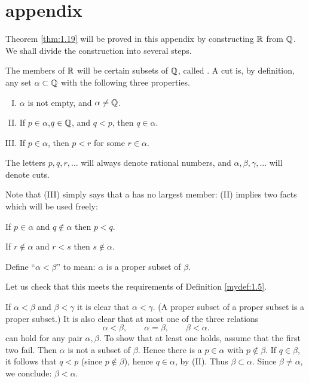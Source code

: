 \section*{appendix}
Theorem \ref{thm:1.19} will be proved in this appendix 
by constructing ${\protect\mathbb R}$ from ${\protect\mathbb Q}$. 
We shall divide the construction into several steps.

The members of ${\protect\mathbb R}$ will be certain subsets of ${\protect\mathbb Q}$, called . 
A cut is, by definition, 
any set $\alpha \subset {\protect\mathbb Q}$ with the following three properties.
\begin{enumerate}[(I)]
    \item $\alpha$ is not empty, and $\alpha \neq {\protect\mathbb Q}$.
    \item If $p\in \alpha$,$q \in {\protect\mathbb Q}$, and $q <p$, then $q \in \alpha$.
    \item If $p \in \alpha$, then $p <r$ for some $r\in \alpha$.
\end{enumerate}

The letters $p, q, r, ...$ will always denote rational numbers, 
and $\alpha, \beta, \gamma, ...$ will denote cuts.

Note that (III) simply says that a has no largest member: 
(II) implies two facts which will be used freely:

If $p\in\alpha$ and $q\not\in\alpha$ then $p<q$.

If $r\not\in \alpha$ and $r<s$ then $s\not\in \alpha$.

Define ``$\alpha < \beta$'' to mean: 
$\alpha$ is a proper subset of $\beta$.

Let us check that this meets the requirements of Definition \ref{mydef:1.5}.

If $\alpha < \beta$ and $\beta < \gamma$ it is clear that $\alpha < \gamma$. 
(A proper subset of a proper subset is a proper subset.) 
It is also clear that at most one of the three relations
\begin{equation*}
    \alpha < \beta, \qquad
    \alpha = \beta, \qquad
    \beta < \alpha.
\end{equation*}
can hold for any pair $\alpha, \beta$. 
To show that at least one holds, assume that the first two fail. 
Then $\alpha$ is not a subset of $\beta$. 
Hence there is a $p \in \alpha$ with $p \not\in \beta$. 
If $q \in \beta$, it follows that $q <p$ (since $p \not\in \beta$), 
hence $q \in \alpha$, by (II). 
Thus $\beta \subset \alpha$. 
Since $\beta \neq \alpha$, we conclude: $\beta < \alpha$.

